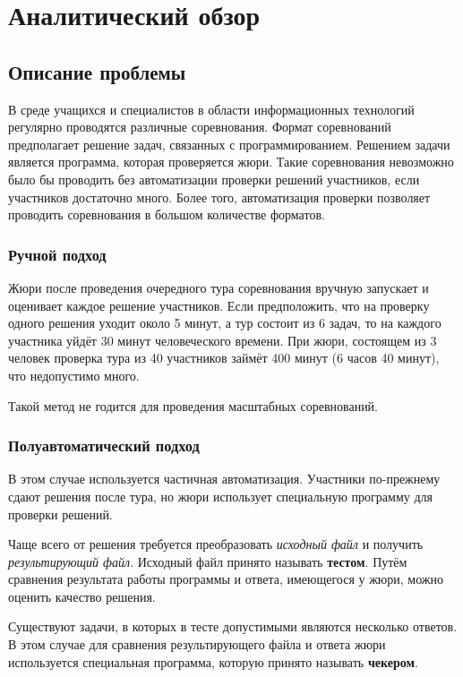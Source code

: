 \chapter{Аналитический обзор}

\section{Описание проблемы}
В среде учащихся и специалистов в области информационных технологий
регулярно проводятся различные соревнования. Формат соревнований предполагает решение задач,
связанных с программированием. Решением задачи является программа, которая проверяется жюри.
Такие соревнования невозможно было бы проводить без автоматизации проверки решений участников,
если участников достаточно много. Более того, автоматизация проверки позволяет проводить соревнования
в большом количестве форматов.

\subsection{Ручной подход}
Жюри после проведения очередного тура соревнования
вручную запускает и оценивает каждое решение участников. Если предположить, что
на проверку одного решения уходит около 5 минут, а тур состоит из 6 задач, то на каждого
участника уйдёт 30 минут человеческого времени. При жюри, состоящем из 3 человек
проверка тура из 40 участников займёт 400 минут (6 часов 40 минут), что недопустимо много.

Такой метод не годится для проведения масштабных соревнований.

\subsection{Полуавтоматический подход}
В этом случае используется частичная автоматизация. Участники по-прежнему сдают решения
после тура, но жюри использует специальную программу для проверки решений.

Чаще всего от решения требуется преобразовать \textit{исходный файл} и получить \textit{результирующий файл}.
Исходный файл принято называть \textbf{тестом}. Путём сравнения результата работы программы
и ответа, имеющегося у жюри, можно оценить качество решения.

Существуют задачи, в которых в тесте допустимыми являются несколько ответов.
В этом случае для сравнения результирующего файла и ответа жюри используется
специальная программа, которую принято называть \textbf{чекером}.


